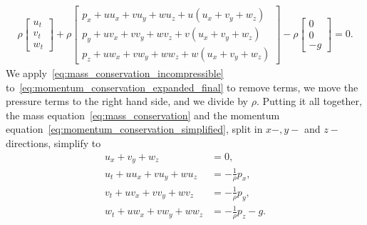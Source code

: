 \begin{align}\label{eq:momentum_conservation_expanded_final}
    \rho \begin{bmatrix}
        u_t \\ v_t \\ w_t
    \end{bmatrix}
    + \rho \begin{bmatrix}
        p_x + u u_x + v u_y + w u_z + u(u_x + v_y + w_z) \\
        p_y + u v_x + v v_y + w v_z + v(u_x + v_y + w_z) \\
        p_z + u w_x + v w_y + w w_z + w(u_x + v_y + w_z) 
    \end{bmatrix}
    - \rho \begin{bmatrix}
        0 \\ 0 \\ -g
    \end{bmatrix} = 0.
\end{align}
We apply~\eqref{eq:mass_conservation_incompressible} to~\eqref{eq:momentum_conservation_expanded_final} to remove terms, we move the pressure terms to the right hand side, and we divide by $\rho$.
Putting it all together, the mass equation~\eqref{eq:mass_conservation} and the momentum equation~\eqref{eq:momentum_conservation_simplified}, split in $x-, y-$ and $z-$directions, simplify to 
\begin{subequations}
    \begin{align}
        u_x + v_y + w_z &= 0, \label{eq:mass_conservation_incompressible_final} \\
        u_t + u u_x + v u_y + w u_z &= - \frac{1}{\rho} p_x, \label{eq:momentum_conservation_x} \\
        v_t + u v_x + v v_y + w v_z &= - \frac{1}{\rho} p_y, \label{eq:momentum_conservation_y} \\
        w_t + u w_x + v w_y + w w_z &= - \frac{1}{\rho} p_z - g. \label{eq:momentum_conservation_z}
    \end{align}
\end{subequations}


